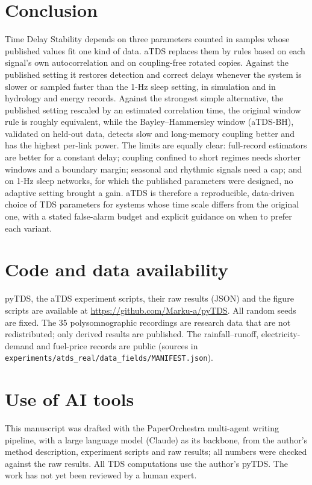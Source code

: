 \documentclass[11pt,a4paper]{article}
\begin{document}
\section{Conclusion}
\label{sec:conclusion}
Time Delay Stability depends on three parameters counted in samples whose published values fit one kind of data. aTDS replaces them by rules based on each signal's own autocorrelation and on coupling-free rotated copies. Against the published setting it restores detection and correct delays whenever the system is slower or sampled faster than the 1-Hz sleep setting, in simulation and in hydrology and energy records. Against the strongest simple alternative, the published setting rescaled by an estimated correlation time, the original window rule is roughly equivalent, while the Bayley--Hammersley window (aTDS-BH), validated on held-out data, detects slow and long-memory coupling better and has the highest per-link power. The limits are equally clear: full-record estimators are better for a constant delay; coupling confined to short regimes needs shorter windows and a boundary margin; seasonal and rhythmic signals need a cap; and on 1-Hz sleep networks, for which the published parameters were designed, no adaptive setting brought a gain. aTDS is therefore a reproducible, data-driven choice of TDS parameters for systems whose time scale differs from the original one, with a stated false-alarm budget and explicit guidance on when to prefer each variant.

\section*{Code and data availability}
pyTDS, the aTDS experiment scripts, their raw results (JSON) and the figure scripts are available at \url{https://github.com/Marku-a/pyTDS}. All random seeds are fixed. The 35 polysomnographic recordings are research data that are not redistributed; only derived results are published. The rainfall--runoff, electricity-demand and fuel-price records are public (sources in \texttt{experiments/atds\_real/data\_fields/MANIFEST.json}).

\section*{Use of AI tools}
This manuscript was drafted with the PaperOrchestra multi-agent writing pipeline, with a large language model (Claude) as its backbone, from the author's method description, experiment scripts and raw results; all numbers were checked against the raw results. All TDS computations use the author's pyTDS. The work has not yet been reviewed by a human expert.
\end{document}
